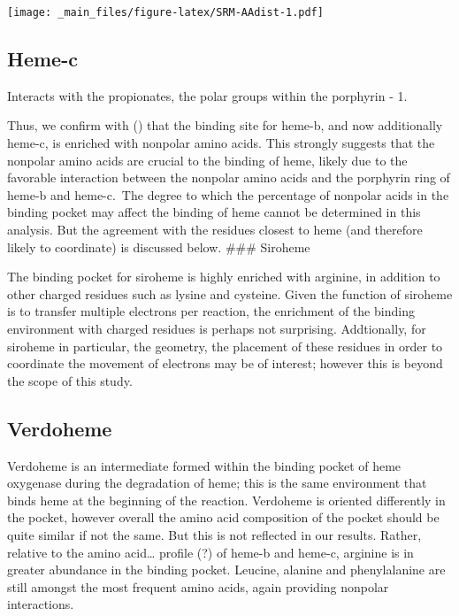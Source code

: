 \documentclass[a4paper, nobind]{templates/ociamthesis}
\let\origfigure\figure
\let\endorigfigure\endfigure
\renewenvironment{figure}[1][2] {
    \expandafter\origfigure\expandafter[H]
} {
    \endorigfigure
}
\begin{document}
\begin{figure}
\centering
\texttt{[image: \_main\_files/figure-latex/SRM-AAdist-1.pdf]}
\caption{\label{fig:SRM-AAdist}SRM: AA Distances}
\end{figure}

\hypertarget{heme-c-1}{%
\subsection{Heme-c}\label{heme-c-1}}

Interacts with the propionates, the polar groups within the porphyrin -
1.

Thus, we confirm with (\textcite{Li2011}) that the binding site for heme-b, and now additionally heme-c, is enriched with nonpolar amino acids. This strongly suggests that the nonpolar amino acids are crucial to the binding of heme, likely due to the favorable interaction between the nonpolar amino acids and the porphyrin ring of heme-b and heme-c.~The degree to which the percentage of nonpolar acids in the binding pocket may affect the binding of heme cannot be determined in this analysis. But the agreement with the residues closest to heme (and therefore likely to coordinate) is discussed below.
\#\#\# Siroheme

The binding pocket for siroheme is highly enriched with arginine, in addition to other charged residues such as lysine and cysteine. Given the function of siroheme is to transfer multiple electrons per reaction, the enrichment of the binding environment with charged residues is perhaps not surprising. Addtionally, for siroheme in particular, the geometry, the placement of these residues in order to coordinate the movement of electrons may be of interest; however this is beyond the scope of this study.

\hypertarget{verdoheme-1}{%
\subsection{Verdoheme}\label{verdoheme-1}}

Verdoheme is an intermediate formed within the binding pocket of heme oxygenase during the degradation of heme; this is the same environment that binds heme at the beginning of the reaction. Verdoheme is oriented differently in the pocket, however overall the amino acid composition of the pocket should be quite similar if not the same. But this is not reflected in our results. Rather, relative to the amino acid\ldots{} profile (?) of heme-b and heme-c, arginine is in greater abundance in the binding pocket. Leucine, alanine and phenylalanine are still amongst the most frequent amino acids, again providing nonpolar interactions.
\end{document}
